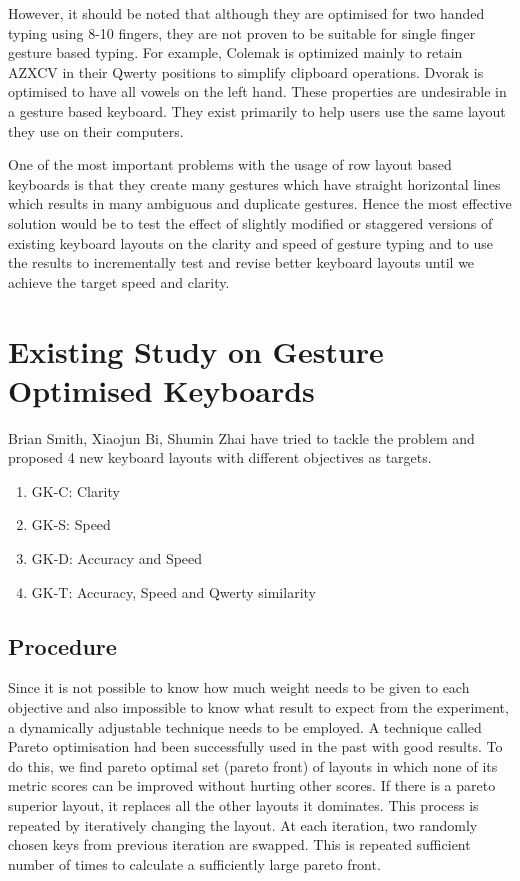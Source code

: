 \documentclass[MTech]{iitmdiss}
\begin{document}
However, it should be noted that although they are optimised for two handed typing using 8-10 fingers, they are not proven to be suitable for single finger gesture based typing. For example, Colemak is optimized mainly to retain AZXCV in their Qwerty positions to simplify clipboard operations. Dvorak is optimised to have all vowels on the left hand. These properties are undesirable in a gesture based keyboard. They exist primarily to help users use the same layout they use on their computers.


One of the most important problems with the usage of row layout based keyboards is that they create many gestures which have straight horizontal lines which results in many ambiguous and duplicate gestures. Hence the most effective solution would be to test the effect of slightly modified or staggered versions of existing keyboard layouts on the clarity and speed of gesture typing and to use the results to incrementally test and revise better keyboard layouts until we achieve the target speed and clarity.


\section{Existing Study on Gesture Optimised Keyboards}
Brian Smith, Xiaojun Bi, Shumin Zhai \citet{gesturerecog} have tried to tackle the problem and proposed 4 new keyboard layouts with different objectives as targets.

\begin{enumerate}
	
	\item GK-C: Clarity
	\item GK-S: Speed
	\item GK-D: Accuracy and Speed
	\item GK-T: Accuracy, Speed and Qwerty similarity
\end{enumerate}


\subsection{Procedure}
Since it is not possible to know how much weight needs to be given to each objective and also impossible to know what result to expect from the experiment, a dynamically adjustable technique needs to be employed. A technique called Pareto optimisation had been successfully used in the past with good results. To do this, we find pareto optimal set (pareto front) of layouts in which none of its metric scores can be improved without hurting other scores. If there is a pareto superior layout, it replaces all the other layouts it dominates. This process is repeated by iteratively changing the layout. At each iteration, two randomly chosen keys from previous iteration are swapped. This is repeated sufficient number of times to calculate a sufficiently large pareto front. 
\end{document}
